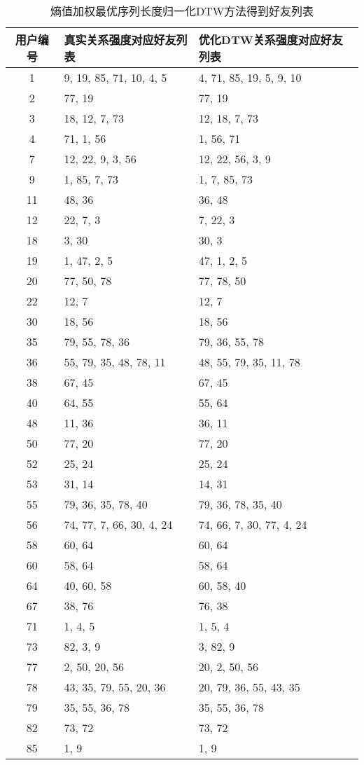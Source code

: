 \begin{table}[htbp]
  \centering
  \caption[优化DTW方法得到好友列表]{熵值加权最优序列长度归一化DTW方法得到好友列表}
  \label{tab:dtwEntResult}
    \begin{tabular}{cll}%
      \toprule[1.5pt]
      用户编号 & 真实关系强度对应好友列表 & 优化DTW关系强度对应好友列表\\
      \midrule[1pt]
      1 & 9, 19, 85, 71, 10, 4, 5 & 4, 71, 85, 19, 5, 9, 10\\
      2 & 77, 19 & 77, 19\\
      3 & 18, 12, 7, 73 & 12, 18, 7, 73\\
      4 & 71, 1, 56 & 1, 56, 71\\
      7 & 12, 22, 9, 3, 56 & 12, 22, 56, 3, 9\\
      9 & 1, 85, 7, 73 & 1, 7, 85, 73\\
      11 & 48, 36 & 36, 48\\
      12 & 22, 7, 3 & 7, 22, 3\\
      18 & 3, 30 & 30, 3\\
      19 & 1, 47, 2, 5 & 47, 1, 2, 5\\
      20 & 77, 50, 78 & 77, 78, 50\\
      22 & 12, 7 & 12, 7\\
      30 & 18, 56 & 18, 56\\
      35 & 79, 55, 78, 36 & 79, 36, 55, 78\\
      36 & 55, 79, 35, 48, 78, 11 & 48, 55, 79, 35, 11, 78\\
      38 & 67, 45 & 67, 45\\
      40 & 64, 55 & 55, 64\\
      48 & 11, 36 & 36, 11\\
      50 & 77, 20 & 77, 20\\
      52 & 25, 24 & 25, 24\\
      53 & 31, 14 & 14, 31\\
      55 & 79, 36, 35, 78, 40 & 79, 36, 78, 35, 40\\
      56 & 74, 77, 7, 66, 30, 4, 24 & 74, 66, 7, 30, 77, 4, 24\\
      58 & 60, 64 & 60, 64\\
      60 & 58, 64 & 58, 64\\
      64 & 40, 60, 58 & 60, 58, 40\\
      67 & 38, 76 & 76, 38\\
      71 & 1, 4, 5 & 1, 5, 4\\
      73 & 82, 3, 9 & 3, 82, 9\\
      77 & 2, 50, 20, 56 & 20, 2, 50, 56\\
      78 & 43, 35, 79, 55, 20, 36 & 20, 79, 36, 55, 43, 35\\
      79 & 35, 55, 36, 78 & 35, 55, 36, 78\\
      82 & 73, 72 & 73, 72\\
      85 & 1, 9 & 1, 9\\
      \bottomrule[1.5pt]
    \end{tabular}
\end{table}
